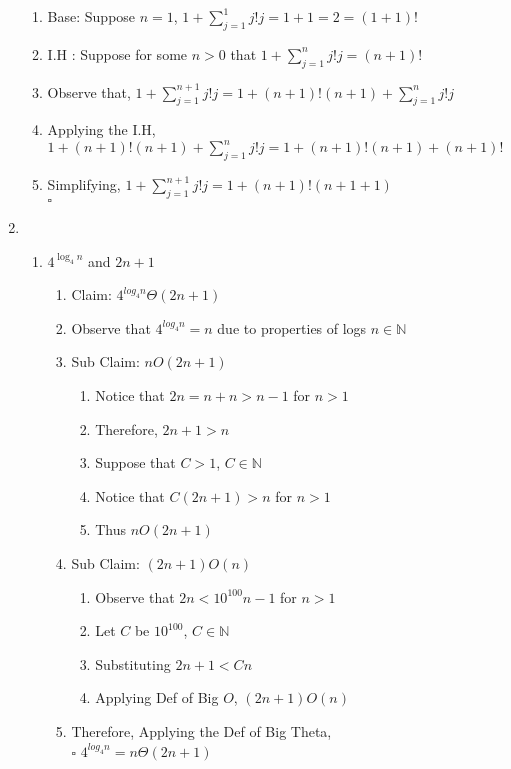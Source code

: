 \documentclass[12pt]{article}
\begin{document}
\begin{enumerate}
\begin{enumerate}
  \item Base: Suppose $n = 1$, $1+\sum_{j=1}^1j!j=1+1=2=(1+1)!$
  \item I.H : Suppose for some $n>0$ that $1+\sum_{j=1}^nj!j=(n+1)!$
  \item Observe that, $1+\sum_{j=1}^{n+1}j!j=1+(n+1)!(n+1)+\sum_{j=1}^nj!j$
  \item Applying the I.H,
    $1+(n+1)!(n+1)+\sum_{j=1}^nj!j=1+(n+1)!(n+1)+(n+1)!$
  \item Simplifying, $1+\sum_{j=1}^{n+1}j!j = 1+(n+1)!(n+1+1)$\\ $\square$
  \end{enumerate}
  \newpage
\item
  \begin{enumerate}
  \item $4^{\log_4{n}}$ and $2n+1$
    \begin{enumerate}
    \item Claim: $4^{log_4n}\Theta{(2n+1)}$
    \item Observe that $4^{log_4 n}=n$ due to properties of logs $n
      \in \mathbb{N}$
    \item Sub Claim: $n O{(2n+1)}$
      \begin{enumerate}
      \item Notice that $2n = n+n > n-1$ for $n>1$
      \item Therefore, $2n+1 > n$
      \item Suppose that $C > 1$, $C\in\mathbb{N}$
      \item Notice that $C(2n+1)> n$ for $n > 1$
      \item Thus $n O{(2n+1)}$
      \end{enumerate}
    \item Sub Claim: $(2n+1)O{(n)}$
      \begin{enumerate}
      \item Observe that $2n < 10^{100}n-1$ for $n>1$
      \item Let $C$ be $10^{100}$, $C \in \mathbb{N}$
      \item Substituting $2n +1< Cn$
      \item Applying Def of Big $O$, $(2n+1)O{(n)}$
      \end{enumerate}
    \item Therefore, Applying the Def of Big Theta,\\ $\square$ $4^{log_{4}n} = n \Theta{(2n+1)}$
    \end{enumerate}

\end{enumerate}
\end{enumerate}
\end{document}
